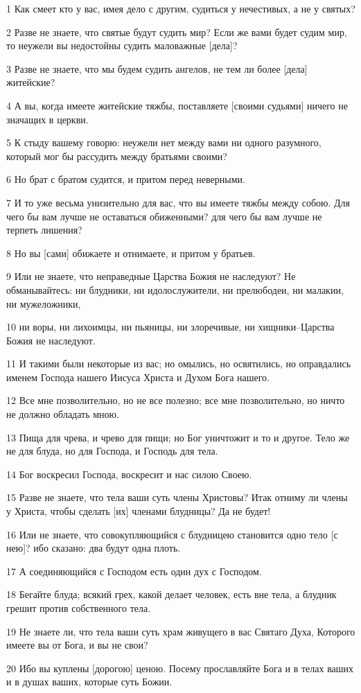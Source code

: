 \par 1 Как смеет кто у вас, имея дело с другим, судиться у нечестивых, а не у святых?
\par 2 Разве не знаете, что святые будут судить мир? Если же вами будет судим мир, то неужели вы недостойны судить маловажные [дела]?
\par 3 Разве не знаете, что мы будем судить ангелов, не тем ли более [дела] житейские?
\par 4 А вы, когда имеете житейские тяжбы, поставляете [своими судьями] ничего не значащих в церкви.
\par 5 К стыду вашему говорю: неужели нет между вами ни одного разумного, который мог бы рассудить между братьями своими?
\par 6 Но брат с братом судится, и притом перед неверными.
\par 7 И то уже весьма унизительно для вас, что вы имеете тяжбы между собою. Для чего бы вам лучше не оставаться обиженными? для чего бы вам лучше не терпеть лишения?
\par 8 Но вы [сами] обижаете и отнимаете, и притом у братьев.
\par 9 Или не знаете, что неправедные Царства Божия не наследуют? Не обманывайтесь: ни блудники, ни идолослужители, ни прелюбодеи, ни малакии, ни мужеложники,
\par 10 ни воры, ни лихоимцы, ни пьяницы, ни злоречивые, ни хищники--Царства Божия не наследуют.
\par 11 И такими были некоторые из вас; но омылись, но освятились, но оправдались именем Господа нашего Иисуса Христа и Духом Бога нашего.
\par 12 Все мне позволительно, но не все полезно; все мне позволительно, но ничто не должно обладать мною.
\par 13 Пища для чрева, и чрево для пищи; но Бог уничтожит и то и другое. Тело же не для блуда, но для Господа, и Господь для тела.
\par 14 Бог воскресил Господа, воскресит и нас силою Своею.
\par 15 Разве не знаете, что тела ваши суть члены Христовы? Итак отниму ли члены у Христа, чтобы сделать [их] членами блудницы? Да не будет!
\par 16 Или не знаете, что совокупляющийся с блудницею становится одно тело [с нею]? ибо сказано: два будут одна плоть.
\par 17 А соединяющийся с Господом есть один дух с Господом.
\par 18 Бегайте блуда; всякий грех, какой делает человек, есть вне тела, а блудник грешит против собственного тела.
\par 19 Не знаете ли, что тела ваши суть храм живущего в вас Святаго Духа, Которого имеете вы от Бога, и вы не свои?
\par 20 Ибо вы куплены [дорогою] ценою. Посему прославляйте Бога и в телах ваших и в душах ваших, которые суть Божии.

